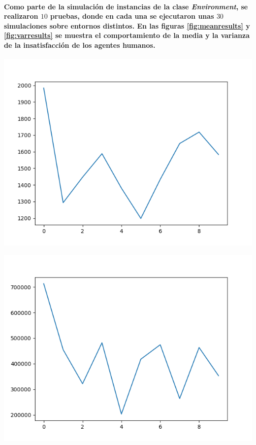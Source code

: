 \documentclass[12pt]{amsart}
\begin{document}
\paragraph{Como parte de la simulación de instancias de la clase \textit{Environment}, se realizaron $10$ pruebas, donde en cada una se ejecutaron unas $30$ simulaciones sobre entornos distintos. En las figuras \ref{fig:meanresults} y \ref{fig:varresults} se muestra el comportamiento de la media y la varianza de la insatisfacción de los agentes humanos.}

\begin{center}
	\includegraphics[scale=0.7]{./images/meanresults.png}
	\label{fig:meanresults}
\end{center}

\begin{center}
	\includegraphics[scale=0.7]{./images/varresults.png}
	\label{fig:varresults}
\end{center}
\end{document}
